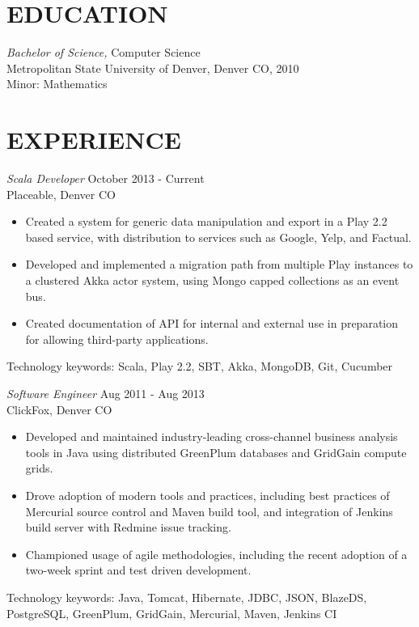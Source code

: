 \documentclass[line,margin]{res}
\begin{document}
\address{2020 Lawrence St \#830, Denver CO 80205}
\address{720-301-4407 / zoe@zgagnon.com}

 
\begin{resume}
 
\section{EDUCATION} {\sl Bachelor of Science,} Computer Science \\
               Metropolitan State University of Denver, Denver CO, 2010 \\
               Minor: Mathematics
 
\section{EXPERIENCE}
{\sl Scala Developer} \hfill October 2013 - Current\\
Placeable, Denver CO
\begin{itemize} 
\item Created a system for generic data manipulation and export in a Play 2.2 based service, with distribution to services such as Google, Yelp, and Factual.
\item Developed and implemented a migration path from multiple Play instances to a clustered Akka actor system, using Mongo
capped collections as an event bus.
\item Created documentation of API for internal and external use in preparation for allowing third-party applications.
\end{itemize}
Technology keywords: Scala, Play 2.2, SBT, Akka, MongoDB, Git, Cucumber

 {\sl Software Engineer} \hfill               Aug 2011 - Aug 2013 \\
	      ClickFox, Denver CO
                 \begin{itemize} %
                 \item Developed and maintained industry-leading cross-channel business analysis tools in Java using distributed GreenPlum databases and GridGain compute grids.
                \item Drove adoption of modern tools and practices, including best practices of Mercurial source control and Maven build tool, 
                and integration of Jenkins build server with Redmine issue tracking.
   	    \item  Championed usage of agile methodologies, including the recent adoption of a two-week sprint and test driven development.
\end{itemize}
	Technology keywords: Java, Tomcat, Hibernate, JDBC, JSON, BlazeDS, PostgreSQL, GreenPlum, GridGain, Mercurial, Maven, Jenkins CI
                

\end{resume}
\end{document}
